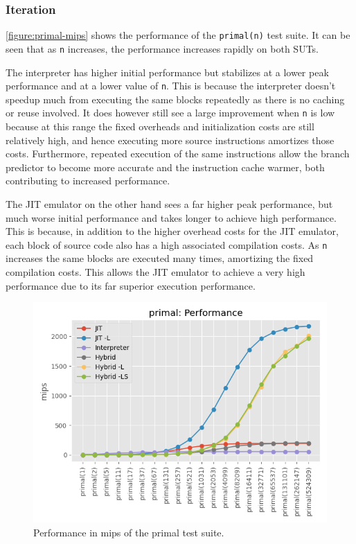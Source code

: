\subsubsection{Iteration}


\autoref{figure:primal-mips} shows the performance of the \texttt{primal(n)} test suite. It can be seen that as \texttt{n} increases, the performance increases rapidly on both SUTs.

The interpreter has higher initial performance but stabilizes at a lower peak performance and at a lower value of \texttt{n}. This is because the interpreter doesn't speedup much from executing the same blocks repeatedly as there is no caching or reuse involved. It does however still see a large improvement when \texttt{n} is low because at this range the fixed overheads and initialization costs are still relatively high, and hence executing more source instructions amortizes those costs. Furthermore, repeated execution of the same instructions allow the branch predictor to become more accurate and the instruction cache warmer, both contributing to increased performance.

The JIT emulator on the other hand sees a far higher peak performance, but much worse initial performance and takes longer to achieve high performance. This is because, in addition to the higher overhead costs for the JIT emulator, each block of source code also has a high associated compilation costs. As \texttt{n} increases the same blocks are executed many times, amortizing the fixed compilation costs. This allows the JIT emulator to achieve a very high performance due to its far superior execution performance.

\begin{figure}[H]
    \centering
    \includegraphics[scale=0.75]{output/graphs/tests/all/primal/mips.png}
    \caption{Performance in mips of the primal test suite.}
    \label{figure:primal-mips}
\end{figure}